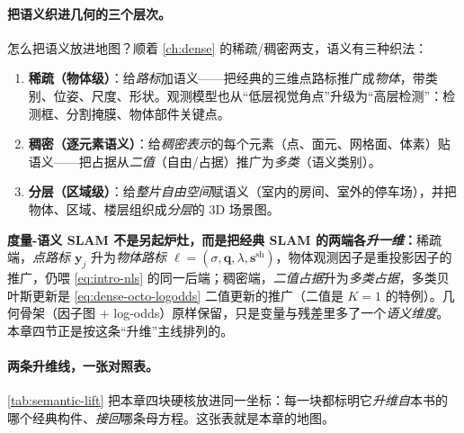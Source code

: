 \paragraph{把语义织进几何的三个层次。}
怎么把语义放进地图？顺着 \cref{ch:dense} 的稀疏/稠密两支，语义有三种织法\cite{carlone2026handbook}：
\begin{enumerate}
  \item \textbf{稀疏（物体级）}：给\emph{路标}加语义——把经典的三维点路标推广成\emph{物体}，带类别、位姿、尺度、形状。观测模型也从“低层视觉角点”升级为“高层检测”：检测框\cite{nicholson2019quadricslam}、分割掩膜\cite{he2017maskrcnn}、物体部件关键点\cite{pavlakos2017semantickeypoints}。
  \item \textbf{稠密（逐元素语义）}：给\emph{稠密表示}的每个元素（点、面元、网格面、体素）贴语义——把占据从\emph{二值}（自由/占据）推广为\emph{多类}（语义类别）。
  \item \textbf{分层（区域级）}：给\emph{整片自由空间}赋语义（室内的房间、室外的停车场），并把物体、区域、楼层组织成\emph{分层}的 3D 场景图。
\end{enumerate}

\begin{insight}
\textbf{度量-语义 SLAM 不是另起炉灶，而是把经典 SLAM 的两端各\emph{升一维}：}稀疏端，\emph{点路标 $\mathbf{y}_j$} 升为\emph{物体路标 $\boldsymbol\ell=(\sigma,\mathbf{q},\lambda,\mathbf{s}^{\mathrm{sh}})$}，物体观测因子是重投影因子的推广，仍喂 \cref{eq:intro-nls} 的同一后端；稠密端，\emph{二值占据}升为\emph{多类占据}，多类贝叶斯更新是 \cref{eq:dense-octo-logodds} 二值更新的推广（二值是 $K{=}1$ 的特例）。几何骨架（因子图 $+$ log-odds）原样保留，只是变量与残差里多了一个\emph{语义维度}。本章四节正是按这条“升维”主线排列的。
\end{insight}

\paragraph{两条升维线，一张对照表。}
\cref{tab:semantic-lift} 把本章四块硬核放进同一坐标：每一块都标明它\emph{升维自}本书的哪个经典构件、\emph{接回}哪条母方程。这张表就是本章的地图。

